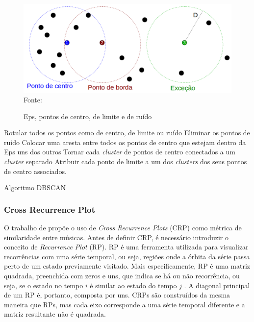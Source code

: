 \begin{itemize}
    \begin{figure}[!htb]
       \centering
       \caption{Eps, pontos de centro, de limite e de ruído}\label{fig:dbscan} 
       \includegraphics[scale=0.80]{figuras/dbscan.png}
       \\Fonte: \cite{wikilivros}
    \end{figure}
    
    \begin{algorithm}[!htb]
        \SetAlgoLined
        Rotular todos os pontos como de centro, de limite ou ruído\;
        Eliminar os pontos de ruído\;
        Colocar uma aresta entre todos os pontos de centro que estejam dentro da Eps uns dos outros\;
        Tornar cada \textit{cluster} de pontos de centro conectados a um \textit{cluster} separado\;
        Atribuir cada ponto de limite a um dos \textit{clusters} dos seus pontos de centro associados.
    \caption{Algoritmo DBSCAN}
    \label{alg:dbscan}
    \end{algorithm}
    
\end{itemize}

\subsubsection{Cross Recurrence Plot} \label{subsubsec:crossRecurrencePlot}
O trabalho de  propõe o uso de \textit{Cross Recurrence Plots} (CRP) como métrica de similaridade entre músicas. Antes de definir CRP, é necessário introduzir o conceito de \textit{Recurrence Plot} (RP). RP é uma ferramenta utilizada para visualizar recorrências com uma série temporal, ou seja, regiões onde a órbita da série passa perto de um estado previamente visitado. Mais especificamente, RP é uma matriz quadrada, preenchida com zeros e uns, que indica se há ou não recorrência, ou seja, se o estado no tempo \({i}\) é similar ao estado do tempo \({j}\) \cite{eckmann1987, alligood1996}. A diagonal principal de um RP é, portanto, composta por uns. CRPs são construídos da mesma maneira que RPs, mas cada eixo corresponde a uma série temporal diferente e a matriz resultante não é quadrada.

